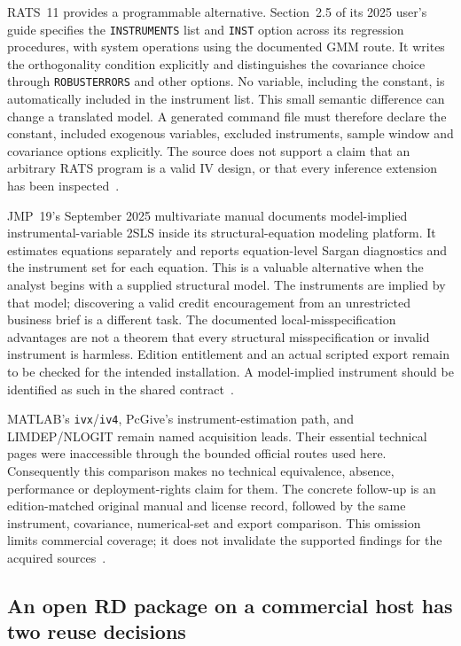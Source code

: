 RATS~11 provides a programmable alternative. Section~2.5 of its 2025
user's guide specifies the \texttt{INSTRUMENTS} list and \texttt{INST}
option across its regression procedures, with system operations using
the documented GMM route. It writes the orthogonality condition explicitly
and distinguishes the covariance choice through \texttt{ROBUSTERRORS}
and other options. No variable, including the constant, is automatically
included in the instrument list. This small semantic difference can
change a translated model. A generated command file must therefore
declare the constant, included exogenous variables, excluded instruments,
sample window and covariance options explicitly. The source does not
support a claim that an arbitrary RATS program is a valid IV design,
or that every inference extension has been inspected~\citep{exec13_ivrd_rats}.

JMP~19's September 2025 multivariate manual documents model-implied
instrumental-variable 2SLS inside its structural-equation modeling
platform. It estimates equations separately and reports equation-level
Sargan diagnostics and the instrument set for each equation. This is a
valuable alternative when the analyst begins with a supplied structural
model. The instruments are implied by that model; discovering a valid
credit encouragement from an unrestricted business brief is a different
task. The documented local-misspecification advantages are not a theorem
that every structural misspecification or invalid instrument is harmless.
Edition entitlement and an actual scripted export remain to be checked
for the intended installation. A model-implied instrument should be
identified as such in the shared contract~\citep{exec13_ivrd_jmp}.

MATLAB's \texttt{ivx}/\texttt{iv4}, PcGive's instrument-estimation path,
and LIMDEP/NLOGIT remain named acquisition leads. Their essential technical
pages were inaccessible through the bounded official routes used here.
Consequently this comparison makes no technical equivalence, absence,
performance or deployment-rights claim for them. The concrete follow-up
is an edition-matched original manual and license record, followed by
the same instrument, covariance, numerical-set and export comparison.
This omission limits commercial coverage; it does not invalidate the
supported findings for the acquired sources~\citep{exec13_ivrd_survey}.

\subsection{An open RD package on a commercial host has two reuse decisions}

